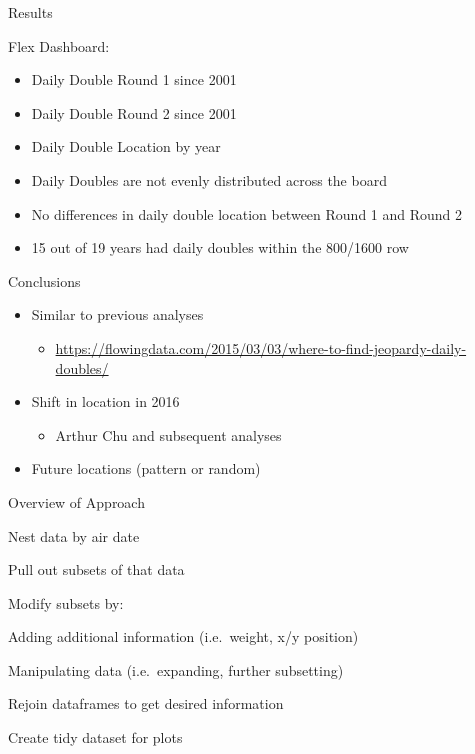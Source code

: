 \documentclass[
  ignorenonframetext,
]{beamer}
\providecommand{\tightlist}{%
  \setlength{\itemsep}{0pt}\setlength{\parskip}{0pt}}
\begin{document}
\begin{frame}{Results}
\protect\hypertarget{results}{}

Flex Dashboard:

\begin{itemize}
\tightlist
\item
  Daily Double Round 1 since 2001
\item
  Daily Double Round 2 since 2001
\item
  Daily Double Location by year 
\item
  Daily Doubles are not evenly distributed across the board
\item
  No differences in daily double location between Round 1 and Round 2
\item
  15 out of 19 years had daily doubles within the 800/1600 row
\end{itemize}

\end{frame}

\begin{frame}{Conclusions}
\protect\hypertarget{conclusions}{}

\begin{itemize}
\tightlist
\item
  Similar to previous analyses

  \begin{itemize}
  \tightlist
  \item
    \url{https://flowingdata.com/2015/03/03/where-to-find-jeopardy-daily-doubles/}
  \end{itemize}
\item
  Shift in location in 2016

  \begin{itemize}
  \tightlist
  \item
    Arthur Chu and subsequent analyses 
  \end{itemize}
\item
  Future locations (pattern or random)
\end{itemize}

\end{frame}

\begin{frame}{Overview of Approach}
\protect\hypertarget{overview-of-approach}{}

Nest data by air date

Pull out subsets of that data

Modify subsets by:

Adding additional information (i.e.~weight, x/y position)

Manipulating data (i.e.~expanding, further subsetting)

Rejoin dataframes to get desired information

Create tidy dataset for plots

\end{frame}
\end{document}
